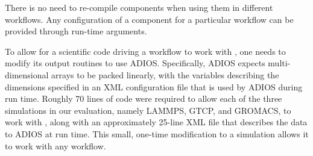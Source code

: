 There is no need to re-compile \sys components when using them
in different workflows. Any configuration
of a component for a particular workflow
can be provided through run-time arguments.

To allow for a scientific code driving a workflow to work with
\sys, one needs to modify its output routines to use ADIOS.
Specifically, ADIOS expects multi-dimensional
arrays to be packed linearly, with the variables
describing the dimensions
specified in an XML configuration file
that is used by ADIOS during run time.
Roughly 70 lines of code were required
to allow each of the three simulations
in our evaluation, namely LAMMPS, GTCP, and GROMACS,
to work with \sys,
along with an approximately 25-line
XML file that describes the data to ADIOS
at run time.
This small, one-time modification to a simulation
allows it to work with any \sys workflow.
